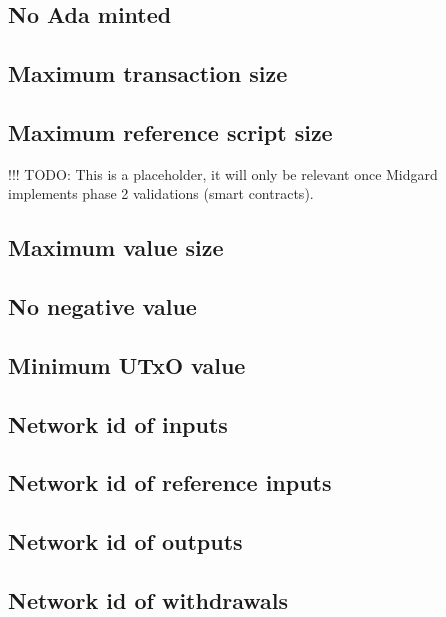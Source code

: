 \documentclass[../main.tex]{subfiles}
\begin{document}
\subsection{No Ada minted}

\subsection{Maximum transaction size}

\subsection{Maximum reference script size}

!!! TODO: This is a placeholder, it will only be relevant once Midgard implements phase 2 validations (smart contracts).

\subsection{Maximum value size}

\subsection{No negative value}

\subsection{Minimum UTxO value}

\subsection{Network id of inputs}

\subsection{Network id of reference inputs}


\subsection{Network id of outputs}

\subsection{Network id of withdrawals}
\end{document}
